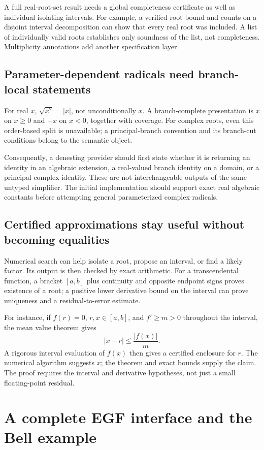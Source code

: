 \documentclass[11pt,a4paper]{article}
\theoremstyle{definition}
\begin{document}
A full real-root-set result needs a global completeness certificate as well as
individual isolating intervals. For example, a verified root bound and counts
on a disjoint interval decomposition can show that every real root was included.
A list of individually valid roots establishes only soundness of the list, not
completeness. Multiplicity annotations add another specification layer.

\subsection{Parameter-dependent radicals need branch-local statements}
For real \(x\), \(\sqrt{x^2}=|x|\), not unconditionally \(x\). A branch-complete
presentation is \(x\) on \(x\geq0\) and \(-x\) on \(x<0\), together with coverage.
For complex roots, even this order-based split is unavailable; a principal-branch
convention and its branch-cut conditions belong to the semantic object.

Consequently, a denesting provider should first state whether it is returning
an identity in an algebraic extension, a real-valued branch identity on a domain,
or a principal complex identity. These are not interchangeable outputs of the
same untyped simplifier. The initial implementation should support exact real
algebraic constants before attempting general parameterized complex radicals.

\subsection{Certified approximations stay useful without becoming equalities}
Numerical search can help isolate a root, propose an interval, or find a likely
factor. Its output is then checked by exact arithmetic. For a transcendental
function, a bracket \([a,b]\) plus continuity and opposite endpoint signs proves
existence of a root; a positive lower derivative bound on the interval can prove
uniqueness and a residual-to-error estimate.

For instance, if \(f(r)=0\), \(r,x\in[a,b]\), and \(f'\geq m>0\) throughout
the interval, the mean value theorem gives
\[
 |x-r|\leq \frac{|f(x)|}{m}.
\]
A rigorous interval evaluation of \(f(x)\) then gives a certified enclosure for
\(r\). The numerical algorithm suggests \(x\); the theorem and exact bounds
supply the claim. The proof requires the interval and derivative hypotheses,
not just a small floating-point residual.

\section{A complete EGF interface and the Bell example}\label{sec:egf}
\end{document}
